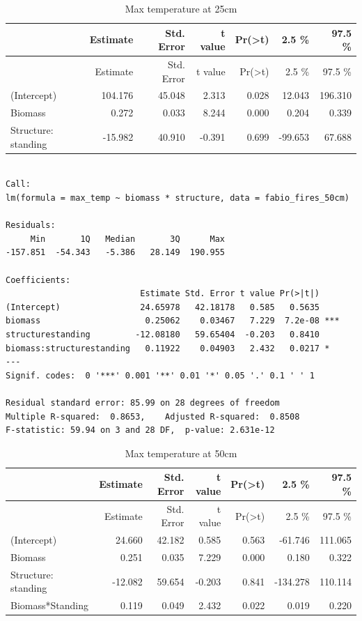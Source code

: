 \documentclass[11pt,a4paper]{article}
\begin{document}
\begin{longtable}[]{@{}lrrrrrr@{}}
\caption{Max temperature at 25cm}\tabularnewline
\toprule
& Estimate & Std. Error & t value &
Pr(\textgreater{}\textbar{}t\textbar{}) & 2.5 \% & 97.5
\%\tabularnewline
\midrule
\endfirsthead
\toprule
& Estimate & Std. Error & t value &
Pr(\textgreater{}\textbar{}t\textbar{}) & 2.5 \% & 97.5
\%\tabularnewline
\midrule
\endhead
(Intercept) & 104.176 & 45.048 & 2.313 & 0.028 & 12.043 &
196.310\tabularnewline
Biomass & 0.272 & 0.033 & 8.244 & 0.000 & 0.204 & 0.339\tabularnewline
Structure: standing & -15.982 & 40.910 & -0.391 & 0.699 & -99.653 &
67.688\tabularnewline
\bottomrule
\end{longtable}

\begin{verbatim}

Call:
lm(formula = max_temp ~ biomass * structure, data = fabio_fires_50cm)

Residuals:
     Min       1Q   Median       3Q      Max 
-157.851  -54.343   -5.386   28.149  190.955 

Coefficients:
                           Estimate Std. Error t value Pr(>|t|)    
(Intercept)                24.65978   42.18178   0.585   0.5635    
biomass                     0.25062    0.03467   7.229  7.2e-08 ***
structurestanding         -12.08180   59.65404  -0.203   0.8410    
biomass:structurestanding   0.11922    0.04903   2.432   0.0217 *  
---
Signif. codes:  0 '***' 0.001 '**' 0.01 '*' 0.05 '.' 0.1 ' ' 1

Residual standard error: 85.99 on 28 degrees of freedom
Multiple R-squared:  0.8653,    Adjusted R-squared:  0.8508 
F-statistic: 59.94 on 3 and 28 DF,  p-value: 2.631e-12
\end{verbatim}

\begin{longtable}[]{@{}lrrrrrr@{}}
\caption{Max temperature at 50cm}\tabularnewline
\toprule
& Estimate & Std. Error & t value &
Pr(\textgreater{}\textbar{}t\textbar{}) & 2.5 \% & 97.5
\%\tabularnewline
\midrule
\endfirsthead
\toprule
& Estimate & Std. Error & t value &
Pr(\textgreater{}\textbar{}t\textbar{}) & 2.5 \% & 97.5
\%\tabularnewline
\midrule
\endhead
(Intercept) & 24.660 & 42.182 & 0.585 & 0.563 & -61.746 &
111.065\tabularnewline
Biomass & 0.251 & 0.035 & 7.229 & 0.000 & 0.180 & 0.322\tabularnewline
Structure: standing & -12.082 & 59.654 & -0.203 & 0.841 & -134.278 &
110.114\tabularnewline
Biomass*Standing & 0.119 & 0.049 & 2.432 & 0.022 & 0.019 &
0.220\tabularnewline
\bottomrule
\end{longtable}
\end{document}
